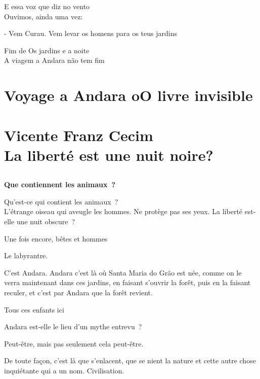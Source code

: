 \pagebreak

E essa voz que diz no vento\\

Ouvimos, ainda uma vez:

- Vem Curau. Vem levar os homens para os teus jardins


\vfill
Fim de Os jardins e a noite\\

A viagem a Andara não tem fim

\clearpage{\pagestyle{empty}\cleardoublepage}
\movetooddpage
\part*{Voyage a Andara oO livre invisible\\
\bigskip
\bigskip
\bigskip
\bigskip
{}\\
\Large{Vicente Franz Cecim}\\
\bigskip
\bigskip
\normalsize{La liberté est une nuit noire?}}

\chapter*{}


\forceindent{}\textbf{Que contiennent les animaux~?}

Qu'est-ce qui contient les animaux~?\\

L'étrange oiseau qui aveugle les hommes. Ne protège pas ses yeux. La
liberté est-elle une nuit obscure~?

Une fois encore, bêtes et hommes

\pagebreak

Le labyrantre.

C'est Andara. Andara c'est là où Santa Maria do Grão est née, comme on
le verra maintenant dans ces jardins, en faisant s'ouvrir la forêt, puis
en la faisant reculer, et c'est par Andara que la forêt revient.

Tous ces enfants ici

Andara est-elle le lieu d'un mythe entrevu~?

Peut-être, mais pas seulement cela peut-être.

De toute façon, c'est là que s'enlacent, que se nient la nature et cette
autre chose inquiétante qui a un nom. Civilisation.

